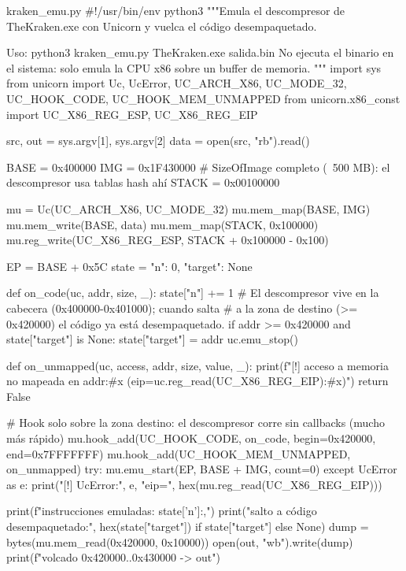 \documentclass[11pt,a4paper]{article}
\begin{document}
\begin{codigopython}{kraken\_emu.py}
#!/usr/bin/env python3
"""Emula el descompresor de TheKraken.exe con Unicorn y vuelca el código desempaquetado.

Uso: python3 kraken_emu.py TheKraken.exe salida.bin
No ejecuta el binario en el sistema: solo emula la CPU x86 sobre un buffer de memoria.
"""
import sys
from unicorn import Uc, UcError, UC_ARCH_X86, UC_MODE_32, UC_HOOK_CODE, UC_HOOK_MEM_UNMAPPED
from unicorn.x86_const import UC_X86_REG_ESP, UC_X86_REG_EIP

src, out = sys.argv[1], sys.argv[2]
data = open(src, "rb").read()

BASE = 0x400000
IMG = 0x1F430000          # SizeOfImage completo (~500 MB): el descompresor usa tablas hash ahí
STACK = 0x00100000

mu = Uc(UC_ARCH_X86, UC_MODE_32)
mu.mem_map(BASE, IMG)
mu.mem_write(BASE, data)
mu.mem_map(STACK, 0x100000)
mu.reg_write(UC_X86_REG_ESP, STACK + 0x100000 - 0x100)

EP = BASE + 0x5C
state = {"n": 0, "target": None}

def on_code(uc, addr, size, _):
    state["n"] += 1
    # El descompresor vive en la cabecera (0x400000-0x401000); cuando salta
    # a la zona de destino (>= 0x420000) el código ya está desempaquetado.
    if addr >= 0x420000 and state["target"] is None:
        state["target"] = addr
        uc.emu_stop()

def on_unmapped(uc, access, addr, size, value, _):
    print(f"[!] acceso a memoria no mapeada en {addr:#x} (eip={uc.reg_read(UC_X86_REG_EIP):#x})")
    return False

# Hook solo sobre la zona destino: el descompresor corre sin callbacks (mucho más rápido)
mu.hook_add(UC_HOOK_CODE, on_code, begin=0x420000, end=0x7FFFFFFF)
mu.hook_add(UC_HOOK_MEM_UNMAPPED, on_unmapped)
try:
    mu.emu_start(EP, BASE + IMG, count=0)
except UcError as e:
    print("[!] UcError:", e, "eip=", hex(mu.reg_read(UC_X86_REG_EIP)))

print(f"instrucciones emuladas: {state['n']:,}")
print("salto a código desempaquetado:", hex(state["target"]) if state["target"] else None)
dump = bytes(mu.mem_read(0x420000, 0x10000))
open(out, "wb").write(dump)
print(f"volcado 0x420000..0x430000 -> {out}")
\end{codigopython}
\end{document}
